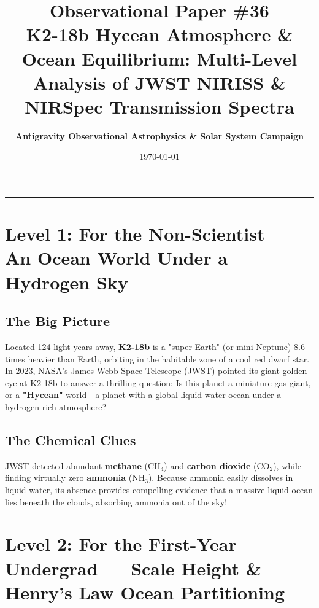 \documentclass[11pt,a4paper]{article}
\title{\Huge \textbf{Observational Paper \#36}\\ \Large K2-18b Hycean Atmosphere \& Ocean Equilibrium: Multi-Level Analysis of JWST NIRISS \& NIRSpec Transmission Spectra}
\author{\textbf{Antigravity Observational Astrophysics \& Solar System Campaign}}
\date{\today}
\begin{document}
\maketitle

\vspace{-1em}
\begin{center}
\rule{\textwidth}{1.5pt}
\end{center}

\section*{Level 1: For the Non-Scientist — An Ocean World Under a Hydrogen Sky}

\subsection*{The Big Picture}
Located 124 light-years away, \textbf{K2-18b} is a "super-Earth" (or mini-Neptune) 8.6 times heavier than Earth, orbiting in the habitable zone of a cool red dwarf star. In 2023, NASA's James Webb Space Telescope (JWST) pointed its giant golden eye at K2-18b to answer a thrilling question: Is this planet a miniature gas giant, or a \textbf{"Hycean"} world—a planet with a global liquid water ocean under a hydrogen-rich atmosphere?

\subsection*{The Chemical Clues}
JWST detected abundant \textbf{methane} ($\mathrm{CH_4}$) and \textbf{carbon dioxide} ($\mathrm{CO_2}$), while finding virtually zero \textbf{ammonia} ($\mathrm{NH_3}$). Because ammonia easily dissolves in liquid water, its absence provides compelling evidence that a massive liquid ocean lies beneath the clouds, absorbing ammonia out of the sky!

\newpage

\section*{Level 2: For the First-Year Undergrad — Scale Height \& Henry's Law Ocean Partitioning}
\end{document}
